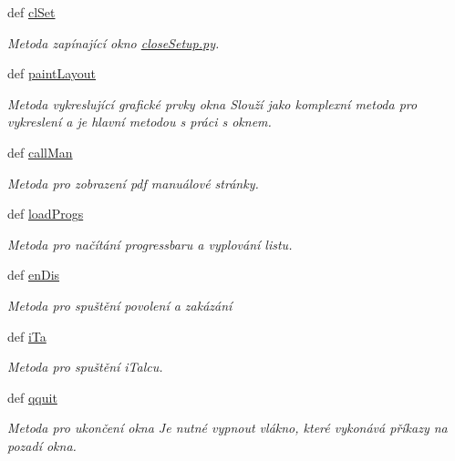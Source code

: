 \begin{DoxyCompactItemize}
def \hyperlink{classmnWindow_1_1App_a9c892833aaab9a00f5e04afd5cfc83bf}{cl\-Set}
\begin{DoxyCompactList}\small\item\em Metoda zapínající okno \hyperlink{closeSetup_8py}{close\-Setup.\-py}. \end{DoxyCompactList}\item 
def \hyperlink{classmnWindow_1_1App_a3a711688d2463a65d43a0a9dcc19276c}{paint\-Layout}
\begin{DoxyCompactList}\small\item\em Metoda vykreslující grafické prvky okna Slouží jako komplexní metoda pro vykreslení a je hlavní metodou s práci s oknem. \end{DoxyCompactList}\item 
def \hyperlink{classmnWindow_1_1App_a91341b90df0f9dde4e3ea9569d936e9c}{call\-Man}
\begin{DoxyCompactList}\small\item\em Metoda pro zobrazení pdf manuálové stránky. \end{DoxyCompactList}\item 
def \hyperlink{classmnWindow_1_1App_aa07a9b47b0fc8969a970edff8ecc1b56}{load\-Progs}
\begin{DoxyCompactList}\small\item\em Metoda pro načítání progressbaru a vyplování listu. \end{DoxyCompactList}\item 
def \hyperlink{classmnWindow_1_1App_a406244c1526206699c931f64fd7e1789}{en\-Dis}
\begin{DoxyCompactList}\small\item\em Metoda pro spuštění povolení a zakázání \end{DoxyCompactList}\item 
def \hyperlink{classmnWindow_1_1App_a52d48174831c728d5ee3e7f0684aadb3}{i\-Ta}
\begin{DoxyCompactList}\small\item\em Metoda pro spuštění i\-Talcu. \end{DoxyCompactList}\item 
def \hyperlink{classmnWindow_1_1App_a6db9e81dd9a0225e260c43852f6bdcc4}{qquit}
\begin{DoxyCompactList}\small\item\em Metoda pro ukončení okna Je nutné vypnout vlákno, které vykonává příkazy na pozadí okna. \end{DoxyCompactList}\end{DoxyCompactItemize}

